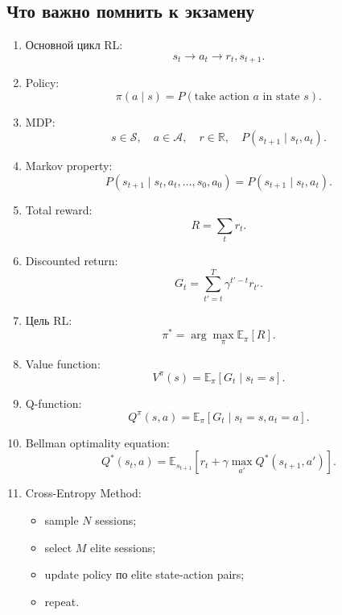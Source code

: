 \documentclass[a4paper,12pt]{article}
\begin{document}
\subsection{Что важно помнить к экзамену}

\begin{enumerate}
    \item Основной цикл RL:
    \[
    s_t \rightarrow a_t \rightarrow r_t, s_{t+1}.
    \]

    \item Policy:
    \[
    \pi(a \mid s)
    =
    P(\text{take action } a \text{ in state } s).
    \]

    \item MDP:
    \[
    s \in \mathcal{S},
    \quad
    a \in \mathcal{A},
    \quad
    r \in \mathbb{R},
    \quad
    P(s_{t+1}\mid s_t,a_t).
    \]

    \item Markov property:
    \[
    P(s_{t+1} \mid s_t,a_t,\dots,s_0,a_0)
    =
    P(s_{t+1}\mid s_t,a_t).
    \]

    \item Total reward:
    \[
    R=\sum_t r_t.
    \]

    \item Discounted return:
    \[
    G_t =
    \sum_{t'=t}^{T}
    \gamma^{t'-t}r_{t'}.
    \]

    \item Цель RL:
    \[
    \pi^*
    =
    \arg\max_\pi
    \mathbb{E}_{\pi}[R].
    \]

    \item Value function:
    \[
    V^\pi(s)
    =
    \mathbb{E}_{\pi}[G_t\mid s_t=s].
    \]

    \item Q-function:
    \[
    Q^\pi(s,a)
    =
    \mathbb{E}_{\pi}[G_t\mid s_t=s,a_t=a].
    \]

    \item Bellman optimality equation:
    \[
    Q^*(s_t,a)
    =
    \mathbb{E}_{s_{t+1}}
    \left[
    r_t+
    \gamma\max_{a'}Q^*(s_{t+1},a')
    \right].
    \]

    \item Cross-Entropy Method:
    \begin{itemize}
        \item sample \(N\) sessions;
        \item select \(M\) elite sessions;
        \item update policy по elite state-action pairs;
        \item repeat.
    \end{itemize}


\end{enumerate}
\end{document}
